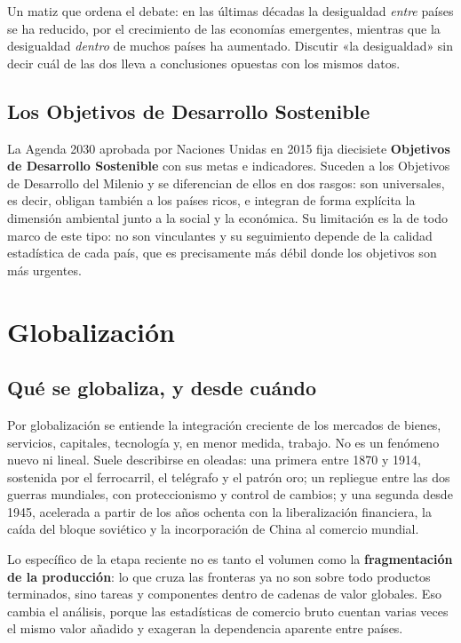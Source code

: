 Un matiz que ordena el debate: en las últimas décadas la desigualdad
\emph{entre} países se ha reducido, por el crecimiento de las economías
emergentes, mientras que la desigualdad \emph{dentro} de muchos países ha
aumentado. Discutir «la desigualdad» sin decir cuál de las dos lleva a
conclusiones opuestas con los mismos datos.

\subsection{Los Objetivos de Desarrollo Sostenible}

La Agenda 2030 aprobada por Naciones Unidas en 2015 fija diecisiete
\textbf{Objetivos de Desarrollo Sostenible} con sus metas e indicadores.
Suceden a los Objetivos de Desarrollo del Milenio y se diferencian de ellos en
dos rasgos: son universales, es decir, obligan también a los países ricos, e
integran de forma explícita la dimensión ambiental junto a la social y la
económica. Su limitación es la de todo marco de este tipo: no son vinculantes y
su seguimiento depende de la calidad estadística de cada país, que es
precisamente más débil donde los objetivos son más urgentes.

\section{Globalización}

\subsection{Qué se globaliza, y desde cuándo}

Por globalización se entiende la integración creciente de los mercados de
bienes, servicios, capitales, tecnología y, en menor medida, trabajo. No es un
fenómeno nuevo ni lineal. Suele describirse en oleadas: una primera entre 1870
y 1914, sostenida por el ferrocarril, el telégrafo y el patrón oro; un
repliegue entre las dos guerras mundiales, con proteccionismo y control de
cambios; y una segunda desde 1945, acelerada a partir de los años ochenta con
la liberalización financiera, la caída del bloque soviético y la incorporación
de China al comercio mundial.

Lo específico de la etapa reciente no es tanto el volumen como la
\textbf{fragmentación de la producción}: lo que cruza las fronteras ya no son
sobre todo productos terminados, sino tareas y componentes dentro de cadenas de
valor globales. Eso cambia el análisis, porque las estadísticas de comercio
bruto cuentan varias veces el mismo valor añadido y exageran la dependencia
aparente entre países.

